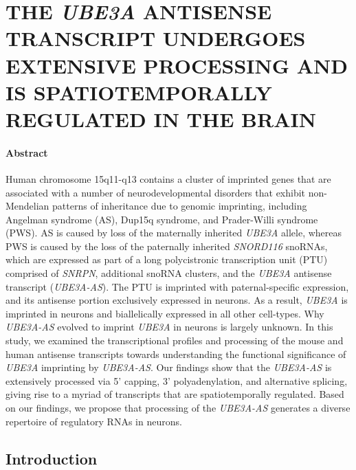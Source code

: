 
\chapter{\uppercase {The \textit{Ube3a} antisense transcript undergoes extensive processing and is spatiotemporally regulated in the brain}}\label{chapter2}

\subsubsection*{Abstract}

Human chromosome 15q11-q13 contains a cluster of imprinted genes that are associated with a number of neurodevelopmental disorders that exhibit non-Mendelian patterns of inheritance due to genomic imprinting, including Angelman syndrome (AS), Dup15q syndrome, and Prader-Willi syndrome (PWS). AS is caused by loss of the maternally inherited \textit{UBE3A} allele, whereas PWS is caused by the loss of the paternally inherited \textit{SNORD116} snoRNAs, which are expressed as part of a long polycistronic transcription unit (PTU) comprised of \textit{SNRPN}, additional snoRNA clusters, and the \textit{UBE3A} antisense transcript (\textit{UBE3A-AS}). The PTU is imprinted with paternal-specific expression, and its antisense portion exclusively expressed in neurons. As a result, \textit{UBE3A} is imprinted in neurons and biallelically expressed in all other cell-types. Why \textit{UBE3A-AS} evolved to imprint \textit{UBE3A} in neurons is largely unknown. In this study, we examined the transcriptional profiles and processing of the mouse and human antisense transcripts towards understanding the functional significance of \textit{UBE3A} imprinting by \textit{UBE3A-AS}. Our findings show that the \textit{UBE3A-AS} is extensively processed via 5' capping, 3' polyadenylation, and alternative splicing, giving rise to a myriad of transcripts that are spatiotemporally regulated. Based on our findings, we propose that processing of the \textit{UBE3A-AS} generates a diverse repertoire of regulatory RNAs in neurons.

\section{Introduction}

